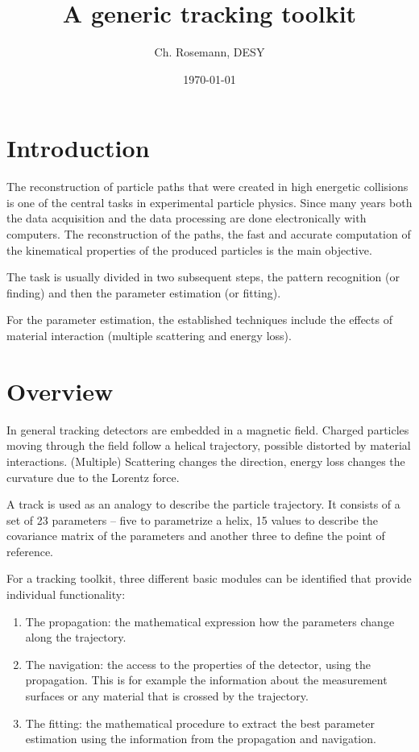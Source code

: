 \documentclass[12pt]{article}
\title{A generic tracking toolkit}
\author{Ch. Rosemann, DESY}
\date{\today}
\begin{document}
\maketitle 
{}

\section{Introduction}
The reconstruction of particle paths that were created in high energetic collisions is one of the central tasks in experimental particle physics.
Since many years both the data acquisition and the data processing are done electronically with computers.
The reconstruction of the paths, the fast and accurate computation of the kinematical properties of the produced particles is the main objective.

The task is usually divided in two subsequent steps, the pattern recognition (or finding) and then the parameter estimation (or fitting).


For the parameter estimation, the established techniques include the effects of material interaction (multiple scattering and energy loss).


\section{Overview}
In general tracking detectors are embedded in a magnetic field.
Charged particles moving through the field follow a helical trajectory, possible distorted by material interactions.
(Multiple) Scattering changes the direction, energy loss changes the curvature due to the Lorentz force.

A track is used as an analogy to describe the particle trajectory.
It consists of a set of 23 parameters -- five to parametrize a helix, 15 values to describe the covariance matrix of the parameters and another three to define the point of reference.

For a tracking toolkit, three different basic modules can be identified that provide individual functionality:
\begin{enumerate}
    \item The propagation: the mathematical expression how the parameters change along the trajectory.
    \item The navigation: the access to the properties of the detector, using the propagation.
    This is for example the information about the measurement surfaces or any material that is crossed by the trajectory.
    \item The fitting: the mathematical procedure to extract the best parameter estimation using the information from the propagation and navigation.
\end{enumerate}
\end{document}
